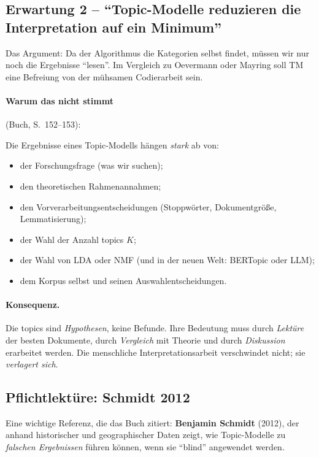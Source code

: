 \documentclass[a4paper,11pt]{article}
\begin{document}
\subsection{Erwartung 2 -- \enquote{Topic-Modelle reduzieren die
Interpretation auf ein Minimum}}

Das Argument: Da der Algorithmus die Kategorien selbst findet, müssen
wir nur noch die Ergebnisse \enquote{lesen}. Im Vergleich zu Oevermann
oder Mayring soll TM eine Befreiung von der mühsamen Codierarbeit sein.

\paragraph{Warum das nicht stimmt} (Buch, S.~152--153):

Die Ergebnisse eines Topic-Modells hängen \emph{stark} ab von:
\begin{itemize}
\item der Forschungsfrage (was wir suchen);
\item den theoretischen Rahmenannahmen;
\item den Vorverarbeitungsentscheidungen (Stoppwörter,
Dokumentgröße, Lemmatisierung);
\item der Wahl der Anzahl topics $K$;
\item der Wahl von LDA oder NMF (und in der neuen Welt: BERTopic
oder LLM);
\item dem Korpus selbst und seinen Auswahlentscheidungen.
\end{itemize}

\paragraph{Konsequenz.} Die topics sind \emph{Hypothesen}, keine
Befunde. Ihre Bedeutung muss durch \emph{Lektüre} der besten
Dokumente, durch \emph{Vergleich} mit Theorie und durch
\emph{Diskussion} erarbeitet werden. Die menschliche
Interpretationsarbeit verschwindet nicht; sie \emph{verlagert sich}.

\subsection{Pflichtlektüre: Schmidt 2012}

Eine wichtige Referenz, die das Buch zitiert: \textbf{Benjamin
Schmidt} (2012), der anhand historischer und geographischer Daten
zeigt, wie Topic-Modelle zu \emph{falschen Ergebnissen} führen können,
wenn sie \enquote{blind} angewendet werden.
\end{document}
